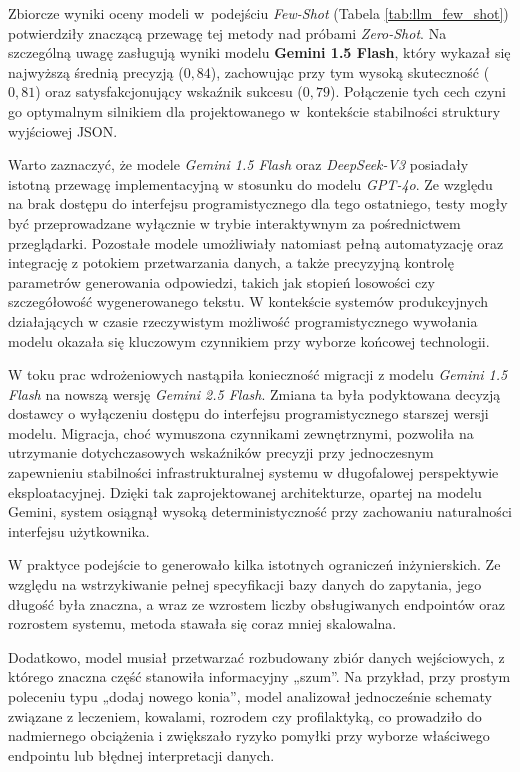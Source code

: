 Zbiorcze wyniki oceny modeli w~podejściu \textit{Few-Shot} (Tabela \ref{tab:llm_few_shot}) potwierdziły znaczącą przewagę tej metody nad próbami \textit{Zero-Shot}. Na szczególną uwagę zasługują wyniki modelu \textbf{Gemini 1.5 Flash}, który wykazał się najwyższą średnią precyzją ($0,84$), zachowując przy tym wysoką skuteczność ($0,81$) oraz satysfakcjonujący wskaźnik sukcesu ($0,79$). Połączenie tych cech czyni go optymalnym silnikiem dla projektowanego  w~kontekście stabilności struktury wyjściowej JSON.

Warto zaznaczyć, że modele \textit{Gemini 1.5 Flash} oraz \textit{DeepSeek-V3} posiadały istotną przewagę implementacyjną w stosunku do modelu \textit{GPT-4o}. Ze względu na brak dostępu do interfejsu programistycznego dla tego ostatniego, testy mogły być przeprowadzane wyłącznie w trybie interaktywnym za pośrednictwem przeglądarki. Pozostałe modele umożliwiały natomiast pełną automatyzację oraz integrację z potokiem przetwarzania danych, a także precyzyjną kontrolę parametrów generowania odpowiedzi, takich jak stopień losowości czy szczegółowość wygenerowanego tekstu. W kontekście systemów produkcyjnych działających w czasie rzeczywistym możliwość programistycznego wywołania modelu okazała się kluczowym czynnikiem przy wyborze końcowej technologii.

W toku prac wdrożeniowych nastąpiła konieczność migracji z modelu \textit{Gemini 1.5 Flash} na nowszą wersję \textit{Gemini 2.5 Flash}. Zmiana ta była podyktowana decyzją dostawcy o wyłączeniu dostępu do interfejsu programistycznego starszej wersji modelu. Migracja, choć wymuszona czynnikami zewnętrznymi, pozwoliła na utrzymanie dotychczasowych wskaźników precyzji przy jednoczesnym zapewnieniu stabilności infrastrukturalnej systemu w długofalowej perspektywie eksploatacyjnej. Dzięki tak zaprojektowanej architekturze, opartej na modelu Gemini, system osiągnął wysoką deterministyczność przy zachowaniu naturalności interfejsu użytkownika.

W praktyce podejście to generowało kilka istotnych ograniczeń inżynierskich. Ze względu na wstrzykiwanie pełnej specyfikacji bazy danych do zapytania, jego długość była znaczna, a wraz ze wzrostem liczby obsługiwanych endpointów oraz rozrostem systemu, metoda stawała się coraz mniej skalowalna.

Dodatkowo, model musiał przetwarzać rozbudowany zbiór danych wejściowych, z którego znaczna część stanowiła informacyjny „szum”. Na przykład, przy prostym poleceniu typu „dodaj nowego konia”, model analizował jednocześnie schematy związane z leczeniem, kowalami, rozrodem czy profilaktyką, co prowadziło do nadmiernego obciążenia i zwiększało ryzyko pomyłki przy wyborze właściwego endpointu lub błędnej interpretacji danych.

